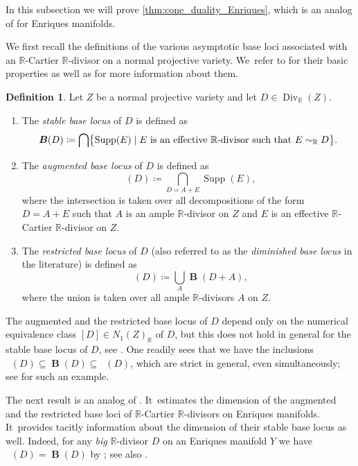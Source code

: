 \documentclass[10pt]{amsart}
\theoremstyle{plain}
\theoremstyle{definition}
\newtheorem{dfn}[thm]{Definition}
\newcommand{\R}{\mathbb{R}}
\DeclareMathOperator{\Supp}{Supp}
\DeclareMathOperator{\Div}{Div}
\DeclareMathOperator{\sbs}{\boldsymbol{B}}
\DeclareMathOperator{\dbs}{\boldsymbol{B}_{--}}
\DeclareMathOperator{\abs}{\boldsymbol{B}_{+}}
\begin{document}
In this subsection we will prove \autoref{thm:cone_duality_Enriques}, which is an analog of \cite[Th.\,B]{DRO25} for Enriques manifolds.

We first recall the definitions of the various asymptotic base loci associated with an $\R$-Cartier $\R$\nobreakdash-divisor on a normal projective variety. We~refer to \cite{Nak04book,ELMNP06,BBP13,TX25} for their basic properties as well as for more information about them.

\begin{dfn}
\label{dfn:asymptoticbaseloci}
Let $Z$ be a normal projective variety and let $D \in \Div_{\R}(Z)$.
\begin{enumerate}
\item
The \emph{stable base locus} of $D$ is defined as
\[
\sbs(D) \coloneqq \bigcap \bigl\{ \Supp(E) \mid E \text{ is an effective $\R$\nobreakdash-divisor such that $E \sim_\R D$} \bigr\}.
\]

\item
The \emph{augmented base locus} of $D$ is defined as
\[
\abs(D) \coloneqq \bigcap_{D=A+E} \Supp(E),
\]
where the intersection is taken over all decompositions of the form $D=A+E$ such that $A$ is an ample $\R$\nobreakdash-divisor on $Z$ and $E$ is an effective $\R$-Cartier $\R$\nobreakdash-divisor on $Z$.

\item
The \emph{restricted base locus} of $D$ (also referred to as the \emph{diminished base locus} in the literature) is defined as
\[
\dbs(D) \coloneqq \bigcup_{A} \sbs(D+A),
\]
where the union is taken over all ample $\R$\nobreakdash-divisors $A$ on $Z$.
\end{enumerate}
\end{dfn}

The augmented and the restricted base locus of $D$ depend only on the numerical equivalence class $[D] \in N_1(Z)_\R$ of $D$, but this does not hold in general for the stable base locus of $D$, see \cite[Ex.\,1.1]{ELMNP06}. One readily sees that we have the inclusions
$\dbs(D) \subseteq \sbs(D) \subseteq \abs(D)$,
which are strict in general, even simultaneously; see \cite[Ex.\,3.4]{TX25} for such an example.

The next result is an analog of \cite[Th.\,A(1)]{DRO25}. It~estimates the dimension of the augmented and the restricted base loci of $\R$-Cartier $\R$\nobreakdash-divisors on Enriques manifolds. It~provides tacitly information about the dimension of their stable base locus as well. Indeed, for any \emph{big} $\R$\nobreakdash-divisor $D$ on an Enriques manifold $Y$ we have $\dbs(D) = \sbs(D)$ by \cite[Cor.\,A]{BBP13}; see also \cite[Cor.\,B(ii)]{TX25}.
\end{document}
